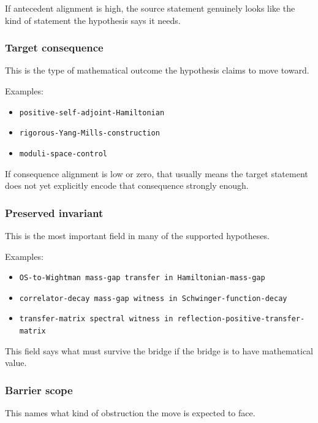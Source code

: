 \documentclass[
]{article}
\providecommand{\tightlist}{%
  \setlength{\itemsep}{0pt}\setlength{\parskip}{0pt}}
\begin{document}
If antecedent alignment is high, the source statement genuinely looks
like the kind of statement the hypothesis says it needs.

\subsubsection{Target consequence}\label{target-consequence}

This is the type of mathematical outcome the hypothesis claims to move
toward.

Examples:

\begin{itemize}
\tightlist
\item
  \texttt{positive-self-adjoint-Hamiltonian}
\item
  \texttt{rigorous-Yang-Mills-construction}
\item
  \texttt{moduli-space-control}
\end{itemize}

If consequence alignment is low or zero, that usually means the target
statement does not yet explicitly encode that consequence strongly
enough.

\subsubsection{Preserved invariant}\label{preserved-invariant}

This is the most important field in many of the supported hypotheses.

Examples:

\begin{itemize}
\tightlist
\item
  \texttt{OS-to-Wightman\ mass-gap\ transfer\ in\ Hamiltonian-mass-gap}
\item
  \texttt{correlator-decay\ mass-gap\ witness\ in\ Schwinger-function-decay}
\item
  \texttt{transfer-matrix\ spectral\ witness\ in\ reflection-positive-transfer-matrix}
\end{itemize}

This field says what must survive the bridge if the bridge is to have
mathematical value.

\subsubsection{Barrier scope}\label{barrier-scope}

This names what kind of obstruction the move is expected to face.
\end{document}
